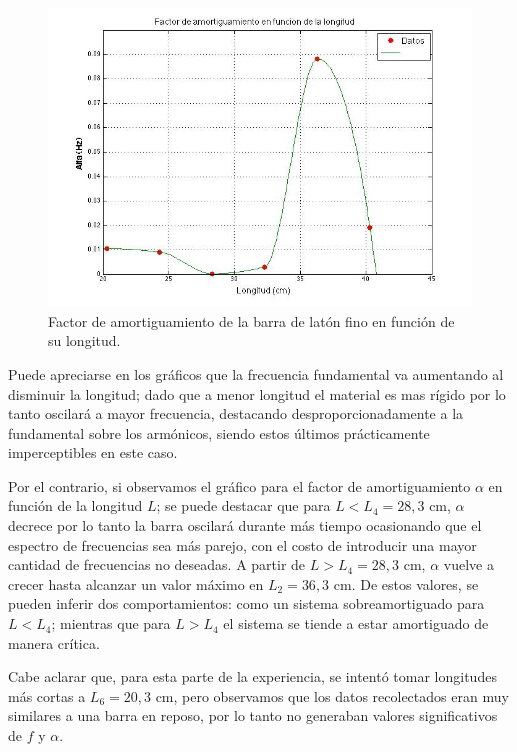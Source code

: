 \documentclass[twoside,twocolumn,a4paper]{article}
\begin{document}
\begin{figure}[H]
\includegraphics[width=\linewidth]{avsl.jpg}
\caption{Factor de amortiguamiento de la barra de lat\'on fino en funci\'on de su longitud.}
\label{fig:avsl}
\end{figure}

Puede apreciarse en los gr\'aficos que la frecuencia fundamental va aumentando al disminuir la longitud; dado que a menor longitud el material es mas r\'igido por lo tanto oscilar\'a a mayor frecuencia, destacando desproporcionadamente a la fundamental sobre los arm\'onicos, siendo estos \'ultimos pr\'acticamente imperceptibles en este caso. \newline

Por el contrario, si observamos el gr\'afico para el factor de amortiguamiento $\alpha$ en funci\'on de la longitud $L$; se puede destacar que para $L < L_{4} = 28,3$ cm, $\alpha$ decrece por lo tanto la barra oscilar\'a durante m\'as tiempo ocasionando que el espectro de frecuencias sea m\'as parejo, con el costo de introducir una mayor cantidad de frecuencias no deseadas.
A partir de $L > L_{4} = 28,3$ cm, $\alpha$ vuelve a crecer hasta alcanzar un valor m\'aximo en $L_{2} = 36,3$ cm. De estos valores, se pueden inferir dos comportamientos: como un sistema sobreamortiguado para $L < L_{4}$; mientras que para $L > L_{4}$ el sistema se tiende a estar amortiguado de manera cr\'itica. 

Cabe aclarar que, para esta parte de la experiencia, se intent\'o tomar longitudes m\'as cortas a $L_{6} = 20,3$ cm, pero observamos que los datos recolectados eran muy similares a una barra en reposo, por lo tanto no generaban valores significativos de $f$ y $\alpha$.
\end{document}
